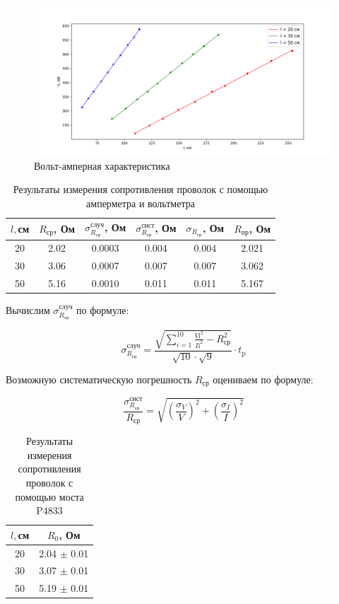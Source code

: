 \documentclass[a4paper,12pt]{article}
\begin{document}
\begin{figure}[H]
\centering
\includegraphics[scale = 0.5]{графики}
\caption{Вольт-амперная характеристика}
\end{figure}

\begin{table}[H]
\centering
\caption{Результаты измерения сопротивления проволок с помощью амперметра и вольтметра}
\begin{tabular}{|c|c|c|c|c|c|}
\hline
$l, $см & $R_{\mbox{ср}}$, Ом & $\sigma_{R_{\mbox{ср}}}^{\mbox{случ}}$, Ом & $\sigma_{R_{\mbox{ср}}}^{\mbox{сист}}$, Ом & $\sigma_{R_{\mbox{ср}}}$, Ом & $R_{\mbox{пр}}$, Ом\\
\hline
20 & 2.02 & 0.0003 & 0.004 & 0.004 & 2.021\\
\hline
30 & 3.06 & 0.0007 & 0.007 & 0.007 & 3.062\\
\hline
50 & 5.16 & 0.0010 & 0.011 & 0.011 & 5.167\\
\hline
\end{tabular}
\end{table}

Вычислим $\sigma_{R_{\mbox{ср}}}^{\mbox{случ}}$ по формуле:

\begin{equation}
\sigma_{R_{\mbox{ср}}}^{\mbox{случ}}=\frac{\sqrt{\sum_{i = 1}^{10}{\frac{V{\mbox{i}}^2}{I{\mbox{i}}^2}}-R_{\mbox{ср}}^2}}{\sqrt{10} \cdot \sqrt{9}} \cdot t_{\mbox{p}}
\end{equation}

Возможную систематическую погрешность $R_{\mbox{ср}}$ оцениваем по формуле:

\begin{equation}
\frac{\sigma_{R_{\mbox{ср}}}^{\mbox{сист}}}{R_{\mbox{ср}}}=\sqrt{\left( \frac{\sigma_V}{V} \right)^2+\left( \frac{\sigma_I}{I} \right)^2}
\end{equation}

\begin{table}[H]
\centering
\caption{Результаты измерения сопротивления проволок с помощью моста P4833}
\begin{tabular}{|c|c|}
\hline
$l, $см & $R_0$, Ом \\
\hline
20 & 2.04 $\pm$ 0.01 \\
\hline
30 & 3.07 $\pm$ 0.01 \\
\hline
50 & 5.19 $\pm$ 0.01 \\
\hline
\end{tabular}
\end{table}
\end{document}
